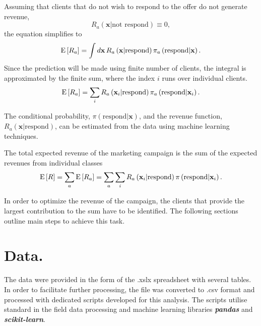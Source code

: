 \documentclass[14pt]{scrartcl}
\begin{document}
Assuming that clients that do not wish to respond to the offer do not
generate revenue, 
\begin{equation}
    R_a(\textbf{x}|\textrm{not respond}) \equiv 0,
\end{equation} 
the equation simplifies to
\begin{equation}
    \textmd{E}\left[R_a\right] =  \int d\mathbf{x}\,R_a \left( \textbf{x}|\textrm{respond} \right) 
                                       \pi_{a}\left(\textrm{respond}|\textbf{x}\right).
\end{equation}
Since the prediction will be made using finite number of clients, the integral
is approximated by the finite sum, where the index $i$ runs over individual clients.
\begin{equation}
    \textmd{E}\left[R_a\right] =  \sum_i R_a \left( \textbf{x}_{i}|\textrm{respond} \right) 
                                        \pi_{a}\left(\textrm{respond}|\textbf{x}_{i}\right).
\end{equation}

The conditional probability, $\pi\left(\textrm{respond}|\textbf{x}\right)$, 
and the revenue function, $R_a \left( \textbf{x}|\textrm{respond} \right)$, 
can be estimated from the data using machine learning techniques.

The total expected revenue of the marketing campaign is the sum of the
expected revenues from individual classes
\begin{equation}
    \textmd{E}\left[R\right] = \sum_a \textmd{E}\left[R_a\right] = \sum_a \sum_i R_a \left( \textbf{x}_{i}|\textrm{respond} \right) 
    \pi\left(\textrm{respond}|\textbf{x}_{i}\right).
    \label{eq:final}
\end{equation}

In order to optimize the revenue of the campaign, the clients that provide the largest
contribution to the sum have to be identified. The following sections outline main 
steps to achieve this task.

\section{Data.}\label{sec:data}
The data were provided in the form of the .xslx spreadsheet with several tables.
In order to facilitate further processing, the file was converted to .csv format
and processed with dedicated scripts developed for this analysis.
The scripts utilise standard in the field data processing and machine learning 
libraries \textbf{\textsl{pandas}} and \textbf{\textsl{scikit-learn}}.
\end{document}
